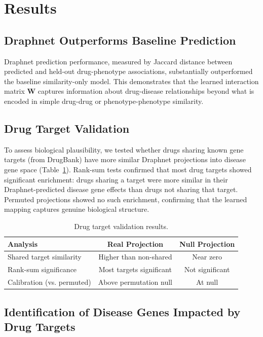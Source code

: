 \documentclass[12pt]{article}
\begin{document}
\section{Results}

\subsection{Draphnet Outperforms Baseline Prediction}

Draphnet prediction performance, measured by Jaccard distance between predicted and held-out drug-phenotype associations, substantially outperformed the baseline similarity-only model. This demonstrates that the learned interaction matrix $\mathbf{W}$ captures information about drug-disease relationships beyond what is encoded in simple drug-drug or phenotype-phenotype similarity.

\subsection{Drug Target Validation}

To assess biological plausibility, we tested whether drugs sharing known gene targets (from DrugBank) have more similar Draphnet projections into disease gene space (Table~\ref{tab:targets}). Rank-sum tests confirmed that most drug targets showed significant enrichment: drugs sharing a target were more similar in their Draphnet-predicted disease gene effects than drugs not sharing that target. Permuted projections showed no such enrichment, confirming that the learned mapping captures genuine biological structure.

\begin{table}[htbp]
\centering
\caption{Drug target validation results.}
\label{tab:targets}
\begin{tabular}{lcc}
\toprule
Analysis & Real Projection & Null Projection \\
\midrule
Shared target similarity & Higher than non-shared & Near zero \\
Rank-sum significance & Most targets significant & Not significant \\
Calibration (vs. permuted) & Above permutation null & At null \\
\bottomrule
\end{tabular}
\end{table}

\subsection{Identification of Disease Genes Impacted by Drug Targets}
\end{document}
